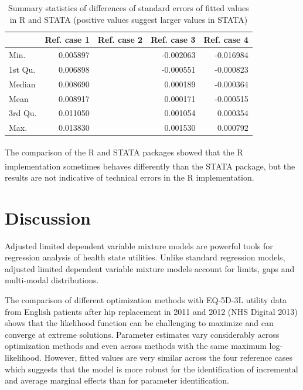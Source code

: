 \documentclass[
]{article}
\begin{document}
\begin{table}[ht]
\centering
\caption{Summary statistics of differences of standard errors of fitted values in R and STATA (positive values suggest larger values in STATA)} 
\label{tab:compse}
\begin{tabular}{lrrrr}
  \hline
 & Ref. case 1 & Ref. case 2 & Ref. case 3 & Ref. case 4 \\ 
  \hline
Min. & 0.005897 &  & -0.002063 & -0.016984 \\ 
  1st Qu. & 0.006898 &  & -0.000551 & -0.000823 \\ 
  Median & 0.008690 &  & 0.000189 & -0.000364 \\ 
  Mean & 0.008917 &  & 0.000171 & -0.000515 \\ 
  3rd Qu. & 0.011050 &  & 0.001054 & 0.000354 \\ 
  Max. & 0.013830 &  & 0.001530 & 0.000792 \\ 
   \hline
\end{tabular}
\end{table}

The comparison of the R and STATA\textsuperscript{\textregistered} packages showed that the R implementation sometimes behaves differently than the STATA\textsuperscript{\textregistered} package, but the results are not indicative of technical errors in the R implementation.

\hypertarget{discussion}{%
\section{Discussion}\label{discussion}}

Adjusted limited dependent variable mixture models are powerful tools for regression analysis of health state utilities. Unlike standard regression models, adjusted limited dependent variable mixture models account for limits, gaps and multi-modal distributions.

The comparison of different optimization methods with EQ-5D-3L utility data from English patients after hip replacement in 2011 and 2012 (NHS Digital 2013) shows that the likelihood function can be challenging to maximize and can converge at extreme solutions. Parameter estimates vary considerably across optimization methods and even across methods with the same maximum log-likelihood. However, fitted values are very similar across the four reference cases which suggests that the model is more robust for the identification of incremental and average marginal effects than for parameter identification.
\end{document}

